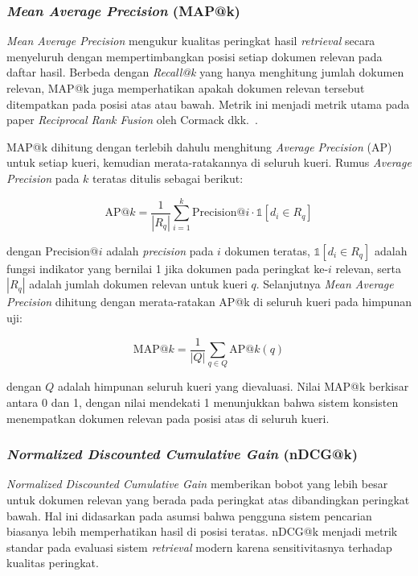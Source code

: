 \subsubsection{\textit{Mean Average Precision} (MAP@k)}

\textit{Mean Average Precision} mengukur kualitas peringkat hasil \textit{retrieval} secara menyeluruh dengan mempertimbangkan posisi setiap dokumen relevan pada daftar hasil. Berbeda dengan \textit{Recall@k} yang hanya menghitung jumlah dokumen relevan, MAP@k juga memperhatikan apakah dokumen relevan tersebut ditempatkan pada posisi atas atau bawah. Metrik ini menjadi metrik utama pada paper \textit{Reciprocal Rank Fusion} oleh Cormack dkk.\ \parencite{cormack2009reciprocal}.

MAP@k dihitung dengan terlebih dahulu menghitung \textit{Average Precision} (AP) untuk setiap kueri, kemudian merata-ratakannya di seluruh kueri. Rumus \textit{Average Precision} pada $k$ teratas ditulis sebagai berikut:

\begin{equation}
\text{AP@}k = \frac{1}{|R_q|} \sum_{i=1}^{k} \text{Precision@}i \cdot \mathbb{1}[d_i \in R_q]
\end{equation}

dengan $\text{Precision@}i$ adalah \textit{precision} pada $i$ dokumen teratas, $\mathbb{1}[d_i \in R_q]$ adalah fungsi indikator yang bernilai 1 jika dokumen pada peringkat ke-$i$ relevan, serta $|R_q|$ adalah jumlah dokumen relevan untuk kueri $q$. Selanjutnya \textit{Mean Average Precision} dihitung dengan merata-ratakan AP@k di seluruh kueri pada himpunan uji:

\begin{equation}
\text{MAP@}k = \frac{1}{|Q|} \sum_{q \in Q} \text{AP@}k(q)
\end{equation}

dengan $Q$ adalah himpunan seluruh kueri yang dievaluasi. Nilai MAP@k berkisar antara 0 dan 1, dengan nilai mendekati 1 menunjukkan bahwa sistem konsisten menempatkan dokumen relevan pada posisi atas di seluruh kueri.

\subsubsection{\textit{Normalized Discounted Cumulative Gain} (nDCG@k)}

\textit{Normalized Discounted Cumulative Gain} memberikan bobot yang lebih besar untuk dokumen relevan yang berada pada peringkat atas dibandingkan peringkat bawah. Hal ini didasarkan pada asumsi bahwa pengguna sistem pencarian biasanya lebih memperhatikan hasil di posisi teratas. nDCG@k menjadi metrik standar pada evaluasi sistem \textit{retrieval} modern karena sensitivitasnya terhadap kualitas peringkat.

